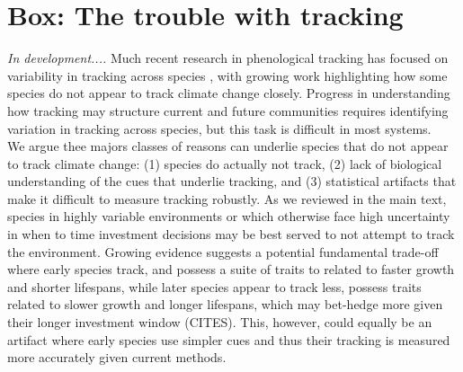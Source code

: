 \documentclass[11pt,letterpaper]{article}
\begin{document}


\section{Box: The trouble with tracking}
\emph{In development....} Much recent research in phenological tracking has focused on variability in tracking across species \citep[e.g.,][]{Willis:2008bf,Cook:2012pnas,bolmgren2013,CaraDonna2014,Zettlemoyer2019}, with growing work highlighting how some species do not appear to track climate change closely. Progress in understanding how tracking may structure current and future communities requires identifying variation in tracking across species, but this task is difficult in most systems. \\

We argue thee majors classes of reasons can underlie species that do not appear to track climate change: (1) species do actually not track, (2) lack of biological understanding of the cues that underlie tracking, and (3) statistical artifacts that make it difficult to measure tracking robustly. As we reviewed in the main text, species in highly variable environments or which otherwise face high uncertainty in when to time investment decisions may be best served to not attempt to track the environment. Growing evidence suggests a potential fundamental trade-off where early species track, and possess a suite of traits to related to faster growth and shorter lifespans, while later species appear to track less, possess traits related to slower growth and longer lifespans, which may bet-hedge more given their longer investment window (CITES). This, however, could equally be an artifact where early species use simpler cues and thus their tracking is measured more accurately given current methods. \\
\end{document}
